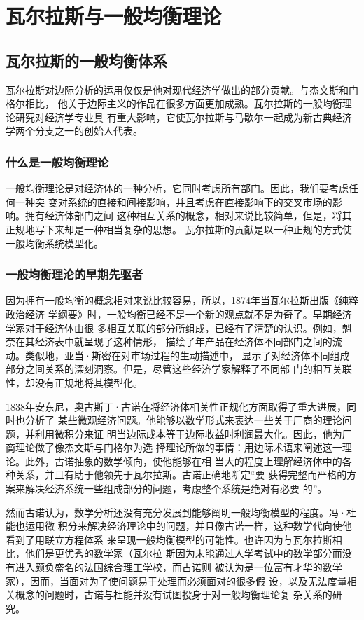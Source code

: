 \chapter{瓦尔拉斯与一般均衡理论}

\section{瓦尔拉斯的一般均衡体系}

瓦尔拉斯对边际分析的运用仅仅是他对现代经济学做出的部分贡献。与杰文斯和门格尔相比，
他关于边际主义的作品在很多方面更加成熟。瓦尔拉斯的一般均衡理论研究对经济学专业具
有重大影响，它使瓦尔拉斯与马歇尔一起成为新古典经济学两个分支之一的创始人代表。

\subsection{什么是一般均衡理论}

一般均衡理论是对经济体的一种分析，它同时考虑所有部门。因此，我们要考虑任何一种突
变对系统的直接和间接影响，并且考虑在直接影响下的交叉市场的影响。拥有经济体部门之间
这种相互关系的概念，相对来说比较简单，但是，将其正规地写下来却是一种相当复杂的思想。
瓦尔拉斯的贡献是以一种正规的方式使一般均衡系统模型化。

\subsection{一般均衡理沦的早期先驱者}

因为拥有一般均衡的概念相对来说比较容易，所以，1874年当瓦尔拉斯出版《纯粹政治经济
学纲要》时，一般均衡已经不是一个新的观点就不足为奇了。早期经济学家对于经济体由很
多相互关联的部分所组成，已经有了清楚的认识。例如，魁奈在其经济表中就呈现了这种情形，
描绘了年产品在经济体不同部门之间的流动。类似地，亚当·斯密在对市场过程的生动描述中，
显示了对经济体不同组成部分之间关系的深刻洞察。但是，尽管这些经济学家解释了不同部
门的相互关联性，却没有正规地将其模型化。

1838年安东尼，奥古斯丁·古诺在将经济体相关性正规化方面取得了重大进展，同时也分析了
某些微观经济问题。他能够以数学形式来表达一些关于厂商的理论问题，并利用微积分来证
明当边际成本等于边际收益时利润最大化。因此，他为厂商理论做了像杰文斯与门格尔为选
择理论所做的事情：用边际术语来阐述这一理论。此外，古诺抽象的数学倾向，使他能够在相
当大的程度上理解经济体中的各种关系，并且有助于他领先于瓦尔拉斯。古诺正确地断定“要
获得完整而严格的方案来解决经济系统一些组成部分的问题，考虑整个系统是绝对有必要
的”。

然而古诺认为，数学分析还没有充分发展到能够阐明一般均衡模型的程度。冯·杜能也运用微
积分来解决经济理论中的问题，并且像古诺一样，这种数学代向使他看到了用联立方程体系
来呈现一般均衡模型的可能性。也许因为与瓦尔拉斯相比，他们是更优秀的数学家（瓦尔拉
斯因为未能通过人学考试中的数学部分而没有进入颇负盛名的法国综合理工学校，而古诺则
被认为是一位富有才华的数学家），因而，当面对为了使问题易于处理而必须面对的很多假
设，以及无法度量相关概念的问题时，古诺与杜能并没有试图投身于对一般均衡理论复
杂关系的研究。

